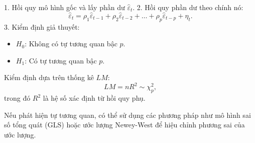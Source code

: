 1. Hồi quy mô hình gốc và lấy phần dư $\hat{\varepsilon}_t$.
2. Hồi quy phần dư theo chính nó:
   \begin{equation}
       \hat{\varepsilon}_t = \rho_1 \hat{\varepsilon}_{t-1} + \rho_2 \hat{\varepsilon}_{t-2} + \dots + \rho_p \hat{\varepsilon}_{t-p} + \eta_t.
   \end{equation}
3. Kiểm định giả thuyết:
   \begin{itemize}
       \item $H_0$: Không có tự tương quan bậc $p$.
       \item $H_1$: Có tự tương quan bậc $p$.
   \end{itemize}
   Kiểm định dựa trên thống kê $LM$:
   \begin{equation}
       LM = n R^2 \sim \chi^2_p,
   \end{equation}
   trong đó $R^2$ là hệ số xác định từ hồi quy phụ.

Nếu phát hiện tự tương quan, có thể sử dụng các phương pháp như mô hình sai số tổng quát (GLS) hoặc ước lượng Newey-West để hiệu chỉnh phương sai của ước lượng.
